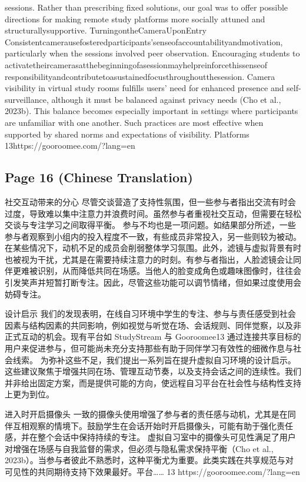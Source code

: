\documentclass[12pt]{ctexart}
\begin{document}
sessions. Rather than prescribing fixed solutions, our goal was to offer possible
directions for making remote study platforms more socially attuned and
structurallysupportive.
TurningontheCameraUponEntry
Consistentcamerausefosteredparticipants’senseofaccountabilityandmotivation,
particularly when the sessions involved peer observation. Encouraging students to
activatetheircamerasatthebeginningofasessionmayhelpreinforcethissenseof
responsibilityandcontributetoasustainedfocusthroughoutthesession.
Camera visibility in virtual study rooms fulfills users’ need for enhanced
presence and self-surveillance, although it must be balanced against privacy
needs (Cho et al., 2023b). This balance becomes especially important in settings
where participants are unfamiliar with one another. Such practices are most
effective when supported by shared norms and expectations of visibility. Platforms
13https://gooroomee.com/?lang=en

\subsection*{Page 16 (Chinese Translation)}

社交互动带来的分心
尽管交谈营造了支持性氛围，但一些参与者指出交流有时会过度，导致难以集中注意力并浪费时间。虽然参与者重视社交互动，但需要在轻松交谈与专注学习之间取得平衡。
参与不均也是一项问题。如结果部分所述，一些参与者观察到小组内的投入程度不一致，有些成员非常投入，另一些则较为被动。在某些情况下，动机不足的成员会削弱整体学习氛围。此外，滤镜与虚拟背景有时也被视为干扰，尤其是在需要持续注意力的时刻。有参与者指出，人脸滤镜会让同伴更难被识别，从而降低共同在场感。当他人的脸变成角色或趣味图像时，往往会引发笑声并短暂打断专注。因此，尽管这些功能可以调节情绪，但如果过度使用会妨碍专注。

设计启示
我们的发现表明，在线自习环境中学生的专注、参与与责任感受到社会因素与结构因素的共同影响，例如视觉与听觉在场、会话规则、同伴觉察，以及非正式互动的机会。现有平台如 StudyStream 与 Gooroomee13 通过连接共享目标的用户来促进参与，但可能尚未充分支持那些有助于同伴学习有效性的细微作息与社会线索。
为弥补这些不足，我们提出一系列旨在提升虚拟自习环境的设计启示。这些建议聚焦于增强共同在场、管理互动节奏，以及支持会话之间的连续性。我们并非给出固定方案，而是提供可能的方向，使远程自习平台在社会性与结构性支持上更为到位。

进入时开启摄像头
一致的摄像头使用增强了参与者的责任感与动机，尤其是在同伴互相观察的情境下。鼓励学生在会话开始时开启摄像头，可能有助于强化责任感，并在整个会话中保持持续的专注。
虚拟自习室中的摄像头可见性满足了用户对增强在场感与自我监督的需求，但必须与隐私需求保持平衡（Cho et al., 2023b）。当参与者彼此不熟悉时，这种平衡尤为重要。此类实践在共享规范与对可见性的共同期待支持下效果最好。平台……
13 https://gooroomee.com/?lang=en
\end{document}
